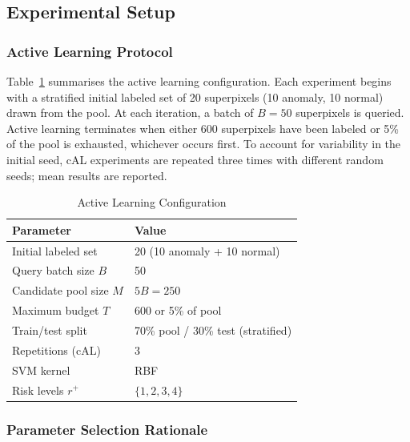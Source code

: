 \documentclass[lettersize,journal]{IEEEtran}
\begin{document}
\subsection{Experimental Setup}

\subsubsection{Active Learning Protocol}

Table~\ref{tab:alconfig} summarises the active learning configuration.
Each experiment begins with a stratified initial labeled set of 20
superpixels (10 anomaly, 10 normal) drawn from the pool. At each
iteration, a batch of $B = 50$ superpixels is queried. Active learning
terminates when either 600 superpixels have been labeled or 5\% of the
pool is exhausted, whichever occurs first. To account for variability
in the initial seed, cAL experiments are repeated three times with
different random seeds; mean results are reported.

\begin{table}[t]
\footnotesize
\centering
\caption{Active Learning Configuration}
\begin{tabular}{l l}
    \toprule
    \textbf{Parameter} & \textbf{Value} \\
    \midrule
    Initial labeled set      & 20 (10 anomaly + 10 normal) \\
    Query batch size $B$     & 50 \\
    Candidate pool size $M$  & $5B = 250$ \\
    Maximum budget $T$       & 600 or 5\% of pool \\
    Train/test split         & 70\% pool / 30\% test (stratified) \\
    Repetitions (cAL)        & 3 \\
    SVM kernel               & RBF \\
    Risk levels $r^{+}$      & $\{1, 2, 3, 4\}$ \\
    \bottomrule
\end{tabular}
\label{tab:alconfig}
\end{table}

\subsubsection{Parameter Selection Rationale}
\end{document}
